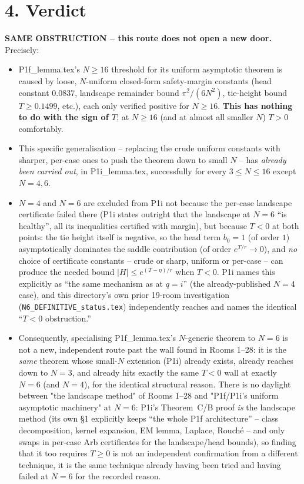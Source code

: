 \documentclass[11pt]{article}
\begin{document}
\section*{4. Verdict}
\textbf{SAME OBSTRUCTION -- this route does not open a new door.} Precisely:
\begin{itemize}
\item P1f\_lemma.tex's $N\ge16$ threshold for its uniform asymptotic theorem is caused by loose,
$N$-uniform closed-form safety-margin constants (head constant $0.0837$, landscape remainder bound
$\pi^2/(6N^2)$, tie-height bound $T\ge0.1499$, etc.), each only verified positive for $N\ge16$.
\textbf{This has nothing to do with the sign of $T$}; at $N\ge16$ (and at almost all smaller $N$)
$T>0$ comfortably.
\item This specific generalisation -- replacing the crude uniform constants with sharper, per-case
ones to push the theorem down to small $N$ -- has \emph{already been carried out}, in
P1i\_lemma.tex, successfully for every $3\le N\le16$ except $N=4,6$.
\item $N=4$ and $N=6$ are excluded from P1i not because the per-case landscape certificate failed
there (P1i states outright that the landscape at $N=6$ ``is healthy'', all its inequalities
certified with margin), but because $T<0$ at both points: the tie height itself is negative, so the
head term $b_0=1$ (of order $1$) asymptotically dominates the saddle contribution (of order
$e^{T/r}\to0$), and \emph{no} choice of certificate constants -- crude or sharp, uniform or
per-case -- can produce the needed bound $|H|\le e^{(T-\eta)/r}$ when $T<0$. P1i names this
explicitly as ``the same mechanism as at $q=i$'' (the already-published $N=4$ case), and this
directory's own prior 19-room investigation (\texttt{N6\_DEFINITIVE\_status.tex}) independently
reaches and names the identical ``$T<0$ obstruction.''
\item Consequently, specialising P1f\_lemma.tex's $N$-generic theorem to $N=6$ is not a new,
independent route past the wall found in Rooms 1--28: it is the \emph{same} theorem whose small-$N$
extension (P1i) already exists, already reaches down to $N=3$, and already hits exactly the same
$T<0$ wall at exactly $N=6$ (and $N=4$), for the identical structural reason. There is no daylight
between "the landscape method" of Rooms 1--28 and "P1f/P1i's uniform asymptotic machinery" at
$N=6$: P1i's Theorem~C/B proof \emph{is} the landscape method (its own \S1 explicitly keeps ``the
whole P1f architecture'' -- class decomposition, kernel expansion, EM lemma, Laplace, Rouch\'e --
and only swaps in per-case Arb certificates for the landscape/head bounds), so finding that it too
requires $T\ge0$ is not an independent confirmation from a different technique, it is the same
technique already having been tried and having failed at $N=6$ for the recorded reason.
\end{itemize}
\end{document}
